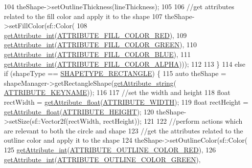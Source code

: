 \begin{DoxyCode}
104         theShape->setOutlineThickness(lineThickness);
105         
106         \textcolor{comment}{//get attributes related to the fill color and apply it to the shape}
107         theShape->setFillColor(sf::Color(
108             \hyperlink{class_abstract_component_a16ac644f742683149b78d01b787eb3bd}{getAttribute\_int}(\hyperlink{_a_e___attributes_8h_a3725edfd1b846140eb49aa34b027b2cb}{ATTRIBUTE\_FILL\_COLOR\_RED}),
109             \hyperlink{class_abstract_component_a16ac644f742683149b78d01b787eb3bd}{getAttribute\_int}(\hyperlink{_a_e___attributes_8h_a44093150b0166936e44f0748babd201c}{ATTRIBUTE\_FILL\_COLOR\_GREEN}),
110             \hyperlink{class_abstract_component_a16ac644f742683149b78d01b787eb3bd}{getAttribute\_int}(\hyperlink{_a_e___attributes_8h_a7c1ee03e64d7b6dd251b709f0130cc62}{ATTRIBUTE\_FILL\_COLOR\_BLUE}),
111             \hyperlink{class_abstract_component_a16ac644f742683149b78d01b787eb3bd}{getAttribute\_int}(\hyperlink{_a_e___attributes_8h_a66939dddc263c09ff273450168b31918}{ATTRIBUTE\_FILL\_COLOR\_ALPHA})));
112 
113     \}
114     \textcolor{keywordflow}{else} \textcolor{keywordflow}{if} (shapeType == \hyperlink{_a_e___attributes_8h_afcd66434a1fe0cb68cca8dbd87a596f9}{SHAPETYPE\_RECTANGLE}) \{
115         \textcolor{keyword}{auto} theShape = shapeManager->getRectangleShape(\hyperlink{class_abstract_component_a4140957094ef40c4ffaa0ef381d00ce5}{getAttribute\_string}(
      \hyperlink{_a_e___attributes_8h_a38d48cad306c55d90faa362aa5023de8}{ATTRIBUTE\_KEYNAME}));
116 
117         \textcolor{comment}{//set the width and height}
118         \textcolor{keywordtype}{float} rectWidth = \hyperlink{class_abstract_component_a890ca92530f6b39afe8c261ce27709c7}{getAttribute\_float}(\hyperlink{_a_e___attributes_8h_aade9a992cd068c12793a1bb56d015022}{ATTRIBUTE\_WIDTH});
119         \textcolor{keywordtype}{float} rectHeight = \hyperlink{class_abstract_component_a890ca92530f6b39afe8c261ce27709c7}{getAttribute\_float}(\hyperlink{_a_e___attributes_8h_ad1f046fde393a66e7c49f97b08af1c0d}{ATTRIBUTE\_HEIGHT});
120         theShape->setSize(sf::Vector2f(rectWidth, rectHeight));
121 
122         \textcolor{comment}{//perform actions which are relevant to both the circle and shape}
123         \textcolor{comment}{//get the attributes related to the outline color and apply it to the shape}
124         theShape->setOutlineColor(sf::Color(
125             \hyperlink{class_abstract_component_a16ac644f742683149b78d01b787eb3bd}{getAttribute\_int}(\hyperlink{_a_e___attributes_8h_a6b45a750496a3996f9a59fb190c22597}{ATTRIBUTE\_OUTLINE\_COLOR\_RED}),
126             \hyperlink{class_abstract_component_a16ac644f742683149b78d01b787eb3bd}{getAttribute\_int}(\hyperlink{_a_e___attributes_8h_a63ec6f1bb23064d48d1e9443eae3e36c}{ATTRIBUTE\_OUTLINE\_COLOR\_GREEN}),

\end{DoxyCode}
